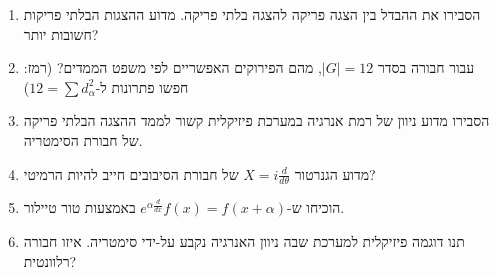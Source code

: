 \begin{enumerate}
    \item הסבירו את ההבדל בין הצגה פריקה להצגה בלתי פריקה. מדוע ההצגות הבלתי פריקות חשובות יותר?
    
    \item עבור חבורה בסדר $|G| = 12$, מהם הפירוקים האפשריים לפי משפט הממדים? (רמז: חפשו פתרונות ל-$12 = \sum d_\alpha^2$)
    
    \item הסבירו מדוע ניוון של רמת אנרגיה במערכת פיזיקלית קשור לממד ההצגה הבלתי פריקה של חבורת הסימטריה.
    
    \item מדוע הגנרטור $X = i\frac{d}{d\theta}$ של חבורת הסיבובים חייב להיות הרמיטי?
    
    \item הוכיחו ש-$e^{\alpha \frac{d}{dx}} f(x) = f(x + \alpha)$ באמצעות טור טיילור.
    
    \item תנו דוגמה פיזיקלית למערכת שבה ניוון האנרגיה נקבע על-ידי סימטריה. איזו חבורה רלוונטית?
\end{enumerate}

\newpage
